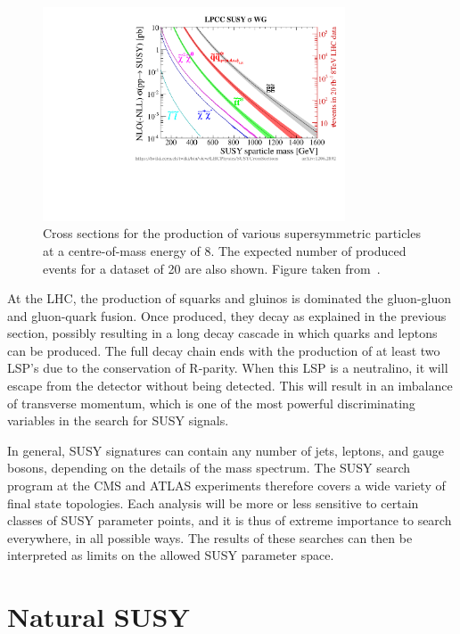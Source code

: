 \begin{figure}
  \centering
  \includegraphics[width=0.8\textwidth]{figures/susy/xsections_strong}
  \caption{Cross sections for the production of various supersymmetric particles at a
centre-of-mass energy of 8\TeV. The expected number of produced events for a dataset of 20\fbinv
are also shown. Figure taken from~\cite{Kramer:2012bx}.
  \label{fig:susy_cross_sections}}
\end{figure}

At the LHC, the production of squarks and gluinos is dominated the gluon-gluon and gluon-quark
fusion. Once produced, they decay as explained in the previous section, possibly resulting in a
long decay cascade in which quarks and leptons can be produced. The full decay chain ends with
the production of at least two LSP's due to the conservation of R-parity. 
When this LSP is a neutralino, it will escape from the detector without being detected. This
will result in an imbalance of transverse momentum, which is one of the most powerful
discriminating variables in the search for SUSY signals. 

In general, SUSY signatures can contain any number of jets, leptons, and gauge bosons, depending on
the details of the mass spectrum. The SUSY search program at the CMS and ATLAS experiments therefore
covers a wide variety of final state topologies. Each analysis will be more or less sensitive to
certain classes of SUSY parameter points, and it is thus of extreme importance to search everywhere,
in all possible ways. The results of these searches can then be interpreted as limits on the
allowed SUSY parameter space. 





\section{Natural SUSY \label{sec:susy_natural_susy}}


